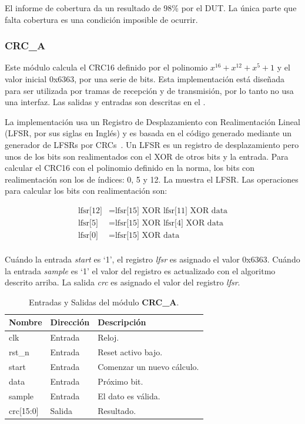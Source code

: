 \documentclass[a4paper, twoside, 11pt]{report}
\begin{document}
El informe de cobertura da un resultado de 98\% por el DUT. La única parte que falta cobertura es una condición imposible de ocurrir.

\FloatBarrier
\subsubsection{CRC\_A}

Este módulo calcula el CRC16 definido por el polinomio $x^{16} + x^{12} + x^{5} + 1$ y el valor inicial 0x6363, por una serie de bits. Esta implementación está diseñada para ser utilizada por tramas de recepción y de transmisión, por lo tanto no usa una interfaz. Las salidas y entradas son descritas en el .

La implementación usa un Registro de Desplazamiento con Realimentación Lineal (LFSR, por sus siglas en Inglés) y es basada en el código generado mediante un generador de LFSRs por CRCs~\cite{crcgen}. Un LFSR es un registro de desplazamiento pero unos de los bits son realimentados con el XOR de otros bits y la entrada. Para calcular el CRC16 con el polinomio definido en la norma, los bits con realimentación son los de índices: 0, 5 y 12. La  muestra el LFSR. Las operaciones para calcular los bits con realimentación son:

{%
  \setlength{\abovedisplayskip}{-3pt}
  \setlength{\belowdisplayskip}{\abovedisplayskip}
  \setlength{\abovedisplayshortskip}{0pt}
  \setlength{\belowdisplayshortskip}{0pt}
  \begin{align*}
    \text{lfsr[12]} &= \text{lfsr[15] XOR lfsr[11] XOR data} \\
    \text{lfsr[5]}  &= \text{lfsr[15] XOR lfsr[4] XOR data} \\
    \text{lfsr[0]}  &= \text{lfsr[15] XOR data}  \\
  \end{align*}
}%

Cuándo la entrada \textit{start} es ‘1’, el registro \textit{lfsr} es asignado el valor 0x6363. Cuándo la entrada \textit{sample} es ‘1’ el valor del registro es actualizado con el algoritmo descrito arriba. La salida \textit{crc} es asignado el valor del registro \textit{lfsr}.

\begin{table}[htb]
  \centering
  \tablezebra
  \begin{tabulary}{\linewidth}{l|l|L}
    \textbf{Nombre}&\textbf{Dirección}&\textbf{Descripción} \\
    \hline
    clk&Entrada&Reloj. \\
    rst\_n&Entrada&Reset activo bajo. \\
    start&Entrada&Comenzar un nuevo cálculo. \\
    data&Entrada&Próximo bit. \\
    sample&Entrada&El dato es válida. \\
    crc[15:0]&Salida&Resultado. \\
  \end{tabulary}
  \caption{Entradas y Salidas del módulo \textbf{CRC\_A}.}
  \label{tab:ports_crc_a}
\end{table}
\end{document}
